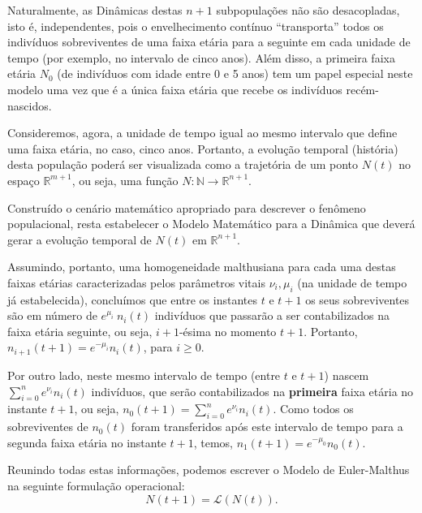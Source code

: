
Naturalmente, as Dinâmicas destas \(n+1\) subpopulações não são desacopladas, isto é, independentes, pois o envelhecimento contínuo ``transporta'' todos os indivíduos sobreviventes de uma faixa etária para a seguinte em cada unidade de tempo (por exemplo, no intervalo de cinco anos). Além disso, a primeira faixa etária \(N_0\) (de indivíduos com idade entre 0 e 5 anos) tem um papel especial neste modelo uma vez que é a única faixa etária que recebe os indivíduos recém-nascidos.

Consideremos, agora, a unidade de tempo igual ao mesmo intervalo que define uma faixa etária, no caso, cinco anos. Portanto, a evolução temporal (história) desta população poderá ser visualizada como a trajetória de um ponto \(N(t)\) no espaço \(\mathbb{R}^{m+1}\), ou seja, uma função \(N: \mathbb{N} \to \mathbb{R}^{n+1}\).

Construído o cenário matemático apropriado para descrever o fenômeno populacional, resta estabelecer o Modelo Matemático para a Dinâmica que deverá gerar a evolução temporal de \(N(t)\) em \(\mathbb{R}^{n+1}\).

Assumindo, portanto, uma homogeneidade malthusiana para cada uma destas faixas etárias caracterizadas pelos parâmetros vitais \(\nu_i, \mu_i\) (na unidade de tempo já estabelecida), concluímos que entre os instantes \(t\) e \(t+1\) os seus sobreviventes são em número de \(e^{\mu_i}\ n_i(t)\) indivíduos que passarão a ser contabilizados na faixa etária seguinte, ou seja, \(i+1\)-ésima no momento \(t+1\). Portanto, \(n_{i+1}(t+1) = e^{-\mu_i} n_i(t)\), para \(i \ge 0\).

Por outro lado, neste mesmo intervalo de tempo (entre \(t\) e \(t+1\)) nascem \(\displaystyle\sum_{i=0}^{n} e^{\nu_i} n_i(t)\) indivíduos, que serão contabilizados na \textbf{primeira} faixa etária no instante \(t+1\), ou seja, \(n_0(t+1) = \displaystyle\sum_{i=0}^{n} e^{\nu_i} n_i(t)\). Como todos os sobreviventes de \(n_0(t)\) foram transferidos após este intervalo de tempo para a segunda faixa etária no instante \(t+1\), temos, \(n_1(t+1) = e^{-\mu_0} n_0(t)\).

Reunindo todas estas informações, podemos escrever o Modelo de Euler-Malthus na seguinte formulação operacional:
\[N(t+1) = \mathcal{L}(N(t)).\]


